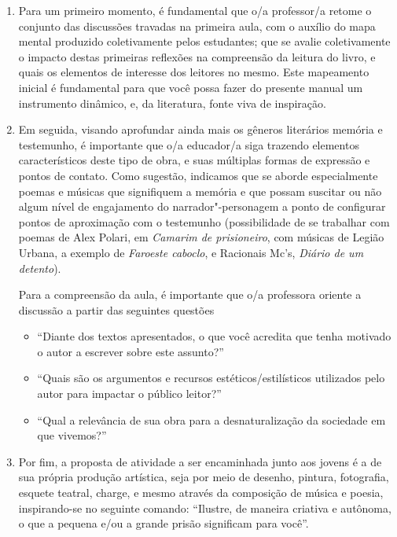 \documentclass[11pt]{extarticle}
\begin{document}
\begin{enumerate}
\item Para um primeiro momento, é fundamental que o/a
professor/a retome o conjunto das discussões travadas na primeira aula,
com o auxílio do mapa mental produzido coletivamente pelos estudantes;
que se avalie coletivamente o impacto destas primeiras reflexões na
compreensão da leitura do livro, e quais os elementos de interesse dos
leitores no mesmo. Este mapeamento inicial é fundamental para que você
possa fazer do presente manual um instrumento dinâmico, e, da literatura,
fonte viva de inspiração. 

\item Em seguida, visando aprofundar ainda mais os
gêneros literários memória e testemunho, é importante que o/a educador/a
siga trazendo elementos característicos deste tipo de obra, e suas
múltiplas formas de expressão e pontos de contato. Como sugestão,
indicamos que se aborde especialmente poemas e músicas que signifiquem a
memória e que possam suscitar ou não algum nível de engajamento do
narrador"-personagem a ponto de configurar pontos de aproximação com o
testemunho (possibilidade de se trabalhar com poemas de Alex Polari, em
\emph{Camarim de prisioneiro}, com músicas de Legião Urbana, a exemplo
de \emph{Faroeste caboclo}, e Racionais Mc's, \emph{Diário de um
detento}). 

Para a compreensão da aula, é importante que o/a professora
oriente a discussão a partir das seguintes questões
\begin{itemize}
\item ``Diante dos textos apresentados, o que você
acredita que tenha motivado o autor a escrever sobre este assunto?''

\item ``Quais são os argumentos e recursos estéticos/estilísticos utilizados
pelo autor para impactar o público leitor?''

\item ``Qual a relevância de sua
obra para a desnaturalização da sociedade em que vivemos?''
\end{itemize}

\item Por fim, a proposta de atividade a ser encaminhada junto aos jovens é a
de sua própria produção artística, seja por meio de desenho, pintura,
fotografia, esquete teatral, charge, e mesmo através da composição de
música e poesia, inspirando-se no seguinte comando: ``Ilustre, de maneira
criativa e autônoma, o que a pequena e/ou a grande prisão significam para
você''. 


\end{enumerate}
\end{document}
